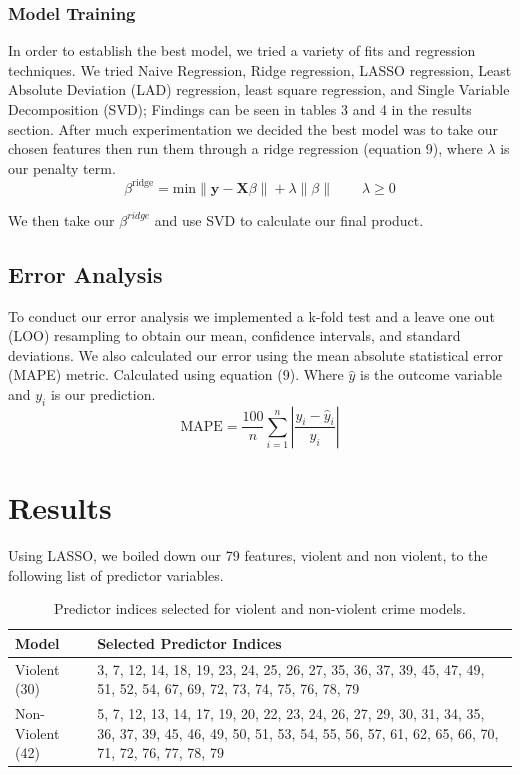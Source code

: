 \documentclass{article}
\begin{document}
\subsubsection{Model Training }
In order to establish the best model, we tried a variety of fits and regression techniques. We tried Naive Regression, Ridge regression, LASSO regression, Least Absolute Deviation (LAD) regression, least square regression, and Single Variable Decomposition (SVD); Findings can be seen in tables 3 and 4 in the results section. After much experimentation we decided the best model was to take our chosen features then run them through a ridge regression (equation 9), where $\lambda$ is our penalty term. 
\begin{equation} \beta^{\text{ridge}} = \text{min}\left\| \mathbf{y} - \mathbf{X}\beta \right\| + \lambda \left\| \beta \right\|\qquad \lambda \ge 0\end{equation}
\begin{noindent}
We then take our $\beta^{ridge}$ and use SVD to calculate our final product. 
\end{noindent}

\subsection{Error Analysis}
To conduct our error analysis we implemented a k-fold test and a leave one out (LOO) resampling to obtain our mean, confidence intervals, and standard deviations. We also calculated our error using the mean absolute statistical error (MAPE) metric. Calculated using equation (9). Where $\hat{y}$ is the outcome variable and $y_i$ is our prediction. 
\begin{equation}
\text{MAPE} = \frac{100}{n} \sum_{i=1}^{n} \left| \frac{y_i - \hat{y}_i}{y_i} \right|
\end{equation}


\section{Results}
Using LASSO, we boiled down our 79 features, violent and non violent, to the following list of predictor variables. 

\begin{table}[h!]
\centering
\begin{tabular}{|l|p{12cm}|}
\hline
\textbf{Model} & \textbf{Selected Predictor Indices} \\
\hline
Violent (30) & 3, 7, 12, 14, 18, 19, 23, 24, 25, 26, 27, 35, 36, 37, 39, 45, 47, 49, 51, 52, 54, 67, 69, 72, 73, 74, 75, 76, 78, 79 \\
\hline
Non-Violent (42) & 5, 7, 12, 13, 14, 17, 19, 20, 22, 23, 24, 26, 27, 29, 30, 31, 34, 35, 36, 37, 39, 45, 46, 49, 50, 51, 53, 54, 55, 56, 57, 61, 62, 65, 66, 70, 71, 72, 76, 77, 78, 79 \\
\hline
\end{tabular}
\caption{Predictor indices selected for violent and non-violent crime models.}
\label{tab:selected-vars}
\end{table}
\end{document}
